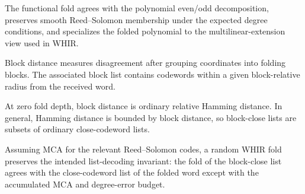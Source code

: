 \begin{lemma}\label{lem:whir_folding_polynomial}
    The functional fold agrees with the polynomial even/odd decomposition, preserves smooth
    Reed--Solomon membership under the expected degree conditions, and specializes the folded
    polynomial to the multilinear-extension view used in WHIR.
\end{lemma}

\begin{definition}\label{def:whir_block_distance}
    Block distance measures disagreement after grouping coordinates into folding blocks.  The
    associated block list contains codewords within a given block-relative radius from the
    received word.
\end{definition}

\begin{lemma}\label{lem:whir_block_distance_bounds}
    At zero fold depth, block distance is ordinary relative Hamming distance.  In general,
    Hamming distance is bounded by block distance, so block-close lists are subsets of ordinary
    close-codeword lists.
\end{lemma}

\begin{theorem}\label{thm:whir_folding_preserves_list_decoding}
    Assuming MCA for the relevant Reed--Solomon codes, a random WHIR fold preserves the
    intended list-decoding invariant: the fold of the block-close list agrees with the
    close-codeword list of the folded word except with the accumulated MCA and degree-error
    budget.
\end{theorem}


